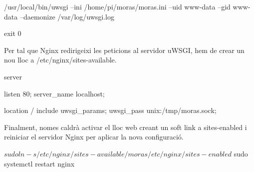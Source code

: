 	\begin{txt}
	[...]

	/usr/local/bin/uwsgi --ini /home/pi/moras/moras.ini
		--uid www-data --gid www-data
		--daemonize /var/log/uwsgi.log

	exit 0
	\end{txt}

	Per tal que Nginx redirigeixi les peticions al servidor uWSGI, hem de crear un nou lloc a /etc/nginx/sites-available.\\

	\begin{txt}
	server {
		listen 80;
		server_name localhost;

		location / {
			include uwsgi_params;
			uwsgi_pass unix:/tmp/moras.sock;
		}
	}
	\end{txt}

	Finalment, nomes caldrà activar el lloc web creant un soft link a sites-enabled i reiniciar el servidor Nginx
	per aplicar la nova configuració.\\
	\begin{bash}
	$ sudo ln -s /etc/nginx/sites-available/moras
		/etc/nginx/sites-enabled
	$ sudo systemctl restart nginx
	\end{bash}
